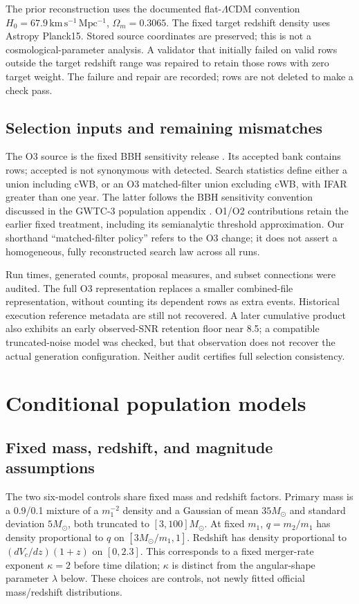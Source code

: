 The prior reconstruction uses the documented flat-$\Lambda$CDM convention $H_0=67.9\,\mathrm{km\,s^{-1}\,Mpc^{-1}}$, $\Omega_m=0.3065$. The fixed target redshift density uses Astropy Planck15. Stored source coordinates are preserved; this is not a cosmological-parameter analysis. A validator that initially failed on valid rows outside the target redshift range was repaired to retain those rows with zero target weight. The failure and repair are recorded; rows are not deleted to make a check pass.

\subsection{Selection inputs and remaining mismatches}
The O3 source is the fixed BBH sensitivity release \cite{o3}. Its accepted bank contains \DataOThreeRows{} rows; accepted is not synonymous with detected. Search statistics define either a union including cWB, or an O3 matched-filter union excluding cWB, with IFAR greater than one year. The latter follows the BBH sensitivity convention discussed in the GWTC-3 population appendix \cite{lvk3}. O1/O2 contributions retain the earlier fixed treatment, including its semianalytic threshold approximation. Our shorthand ``matched-filter policy'' refers to the O3 change; it does not assert a homogeneous, fully reconstructed search law across all runs.

Run times, generated counts, proposal measures, and subset connections were audited. The full O3 representation replaces a smaller combined-file representation, without counting its dependent rows as extra events. Historical execution reference metadata are still not recovered. A later cumulative product also exhibits an early observed-SNR retention floor near 8.5; a compatible truncated-noise model was checked, but that observation does not recover the actual generation configuration. Neither audit certifies full selection consistency.

\section{Conditional population models}\label{sec:models}
\subsection{Fixed mass, redshift, and magnitude assumptions}
The two six-model controls share fixed mass and redshift factors. Primary mass is a 0.9/0.1 mixture of a $m_1^{-2}$ density and a Gaussian of mean $35M_\odot$ and standard deviation $5M_\odot$, both truncated to $[3,100]M_\odot$. At fixed $m_1$, $q=m_2/m_1$ has density proportional to $q$ on $[3M_\odot/m_1,1]$. Redshift has density proportional to $(dV_c/dz)(1+z)$ on $[0,2.3]$. This corresponds to a fixed merger-rate exponent $\kappa=2$ before time dilation; $\kappa$ is distinct from the angular-shape parameter $\lambda$ below. These choices are controls, not newly fitted official mass/redshift distributions.

